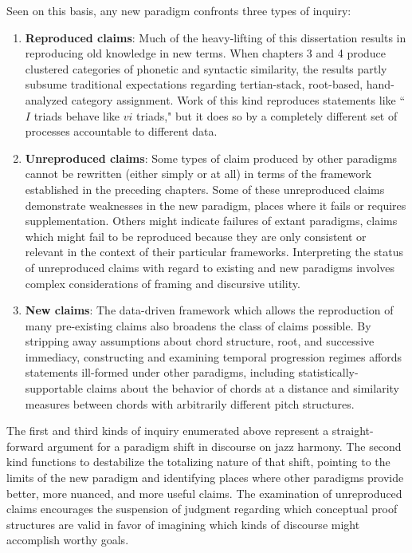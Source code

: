 Seen on this basis, any new paradigm confronts three types of inquiry:
\begin{enumerate}
	\item \textbf{Reproduced claims}: Much of the heavy-lifting of this dissertation results in reproducing old knowledge in new terms.  When chapters 3 and 4 produce clustered categories of phonetic and syntactic similarity, the results partly subsume  traditional expectations regarding tertian-stack, root-based, hand-analyzed category assignment.  Work of this kind reproduces statements like ``$I$ triads behave like $vi$ triads," but it does so by a completely different set of processes accountable to different data.
	\item \textbf{Unreproduced claims}: Some types of claim produced by other paradigms cannot be rewritten (either simply or at all) in terms of the framework established in the preceding chapters.  Some of these unreproduced claims demonstrate weaknesses in the new paradigm, places where it fails or requires supplementation.  Others might indicate failures of extant paradigms, claims which might fail to be reproduced because they are only consistent or relevant in the context of their particular frameworks.  Interpreting the status of unreproduced claims with regard to existing and new paradigms involves complex considerations of framing and discursive utility.
	\item \textbf{New claims}: The data-driven framework which allows the reproduction of many pre-existing claims also broadens the class of claims possible.  By stripping away assumptions about chord structure, root, and successive immediacy, constructing and examining temporal progression regimes affords statements ill-formed under other paradigms, including statistically-supportable claims about the behavior of chords at a distance and similarity measures between chords with arbitrarily different pitch structures.
\end{enumerate}
The first and third kinds of inquiry enumerated above represent a straight-forward argument for a paradigm shift in discourse on jazz harmony.  The second kind functions to destabilize the totalizing nature of that shift, pointing to the limits of the new paradigm and identifying places where other paradigms provide better, more nuanced, and more useful claims.  The examination of unreproduced claims encourages the suspension of judgment regarding which conceptual proof structures are valid in favor of imagining which kinds of discourse might accomplish worthy goals.

